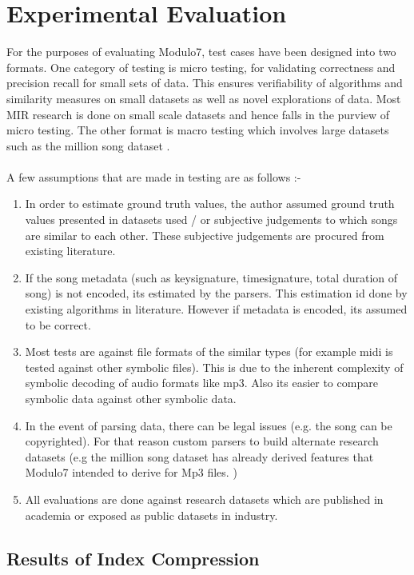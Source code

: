 \chapter{Experimental Evaluation}

\noindent For the purposes of evaluating Modulo7, test cases have been designed into two formats. One category of testing is micro testing, for validating correctness and precision recall for small sets of data. This ensures verifiability of algorithms and similarity measures on small datasets as well as novel explorations of data. Most MIR research is done on small scale datasets and hence falls in the purview of micro testing. The other format is macro testing which involves large datasets such as the million song dataset \cite{msd}. \\\\
A few assumptions that are made in testing are as follows :-
\begin{enumerate}
\item In order to estimate ground truth values, the author assumed ground truth values presented in datasets used / or subjective judgements to which songs are similar to each other. These subjective judgements are procured from existing literature.
\item If the song metadata (such as keysignature, timesignature, total duration of song) is not encoded, its estimated by the parsers. This estimation id done by existing algorithms in literature. However if metadata is encoded, its assumed to be correct. 
\item Most tests are against file formats of the similar types (for example midi is tested against other symbolic files). This is due to the inherent complexity of symbolic decoding of audio formats like mp3. Also its easier to compare symbolic data against other symbolic data.
\item In the event of parsing data, there can be legal issues (e.g. the song can be copyrighted). For that reason custom parsers to build alternate research datasets (e.g the million song dataset has already derived features that Modulo7 intended to derive for Mp3 files. \cite{msd})
\item All evaluations are done against research datasets which are published in academia or exposed as public datasets in industry. 
\end{enumerate}

\section{Results of Index Compression}

